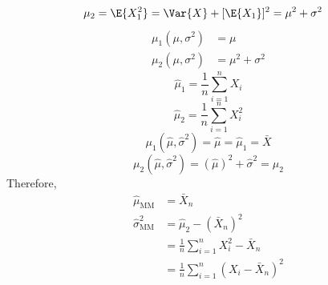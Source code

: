 \begin{Example}{}{}
\begin{enumerate}
\begin{align*}
                  \mu_2 & =\E{X_1^2}=\Var{X}+[\E{X_1}]^2=\mu^2+\sigma^2
              \end{align*}
              \begin{align*}
                  \mu_1(\mu,\sigma^2) & =\mu            \\
                  \mu_2(\mu,\sigma^2) & =\mu^2+\sigma^2
              \end{align*}
              \[ \hat{\mu}_1=\frac{1}{n} \sum_{i=1}^n X_i \]
              \[ \hat{\mu}_2=\frac{1}{n} \sum_{i=1}^{n} X_i^2 \]
              \[ \mu_1(\hat{\mu},\hat{\sigma}^2)=\hat{\mu}=\hat{\mu}_1=\bar{X} \]
              \[ \mu_2(\hat{\mu},\hat{\sigma}^2)=(\hat{\mu})^2+\hat{\sigma}^2=\hat{\mu}_2 \]
              Therefore,
              \begin{align*}
                  \hat{\mu}_{\text{MM}} & =\bar{X}_n                                    \\
                  \hat{\sigma}^2_{\text{MM}}
                                        & =\hat{\mu}_2-(\bar{X}_n)^2                    \\
                                        & =\frac{1}{n} \sum_{i=1}^{n} X_i^2-\bar{X}_n   \\
                                        & =\frac{1}{n} \sum_{i=1}^{n} (X_i-\bar{X}_n)^2
              \end{align*}
    \end{enumerate}
\end{Example}
